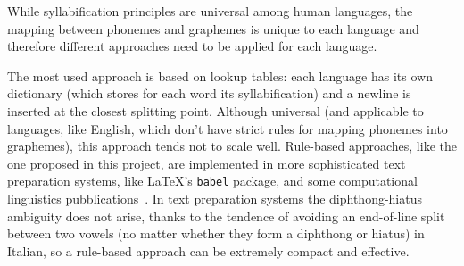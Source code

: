 While syllabification principles are universal among human languages, the mapping between phonemes and graphemes is unique to each language and therefore different approaches need to be applied for each language.

The most used approach is based on lookup tables: each language has its own dictionary (which stores for each word its syllabification) and a newline is inserted at the closest splitting point. Although universal (and applicable to languages, like English, which don't have strict rules for mapping phonemes into graphemes), this approach tends not to scale well.
Rule-based approaches, like the one proposed in this project, are implemented in more sophisticated text preparation systems, like \LaTeX's \texttt{babel} package, and some computational linguistics pubblications~\cite{cioni,adsett}.
In text preparation systems the diphthong-hiatus ambiguity does not arise, thanks to the tendence of avoiding an end-of-line split between two vowels (no matter whether they form a diphthong or hiatus) in Italian, so a rule-based approach can be extremely compact and effective.